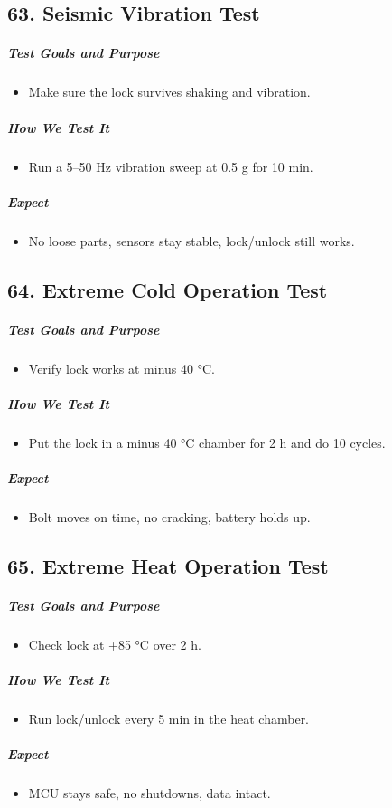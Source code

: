 \subsection*{63. Seismic Vibration Test}
\subparagraph{Test Goals and Purpose}
\begin{itemize}
    \item Make sure the lock survives shaking and vibration.
\end{itemize}
\subparagraph{How We Test It}
\begin{itemize}
    \item Run a 5–50 Hz vibration sweep at 0.5 g for 10 min.
\end{itemize}
\subparagraph{ Expect}
\begin{itemize}
    \item No loose parts, sensors stay stable, lock/unlock still works.
\end{itemize}

\subsection*{64. Extreme Cold Operation Test}
\subparagraph{Test Goals and Purpose}
\begin{itemize}
    \item Verify lock works at minus 40 °C.
\end{itemize}
\subparagraph{How We Test It}
\begin{itemize}
    \item Put the lock in a minus 40 °C chamber for 2 h and do 10 cycles.
\end{itemize}
\subparagraph{ Expect}
\begin{itemize}
    \item Bolt moves on time, no cracking, battery holds up.
\end{itemize}

\subsection*{65. Extreme Heat Operation Test}
\subparagraph{Test Goals and Purpose}
\begin{itemize}
    \item Check lock at +85 °C over 2 h.
\end{itemize}
\subparagraph{How We Test It}
\begin{itemize}
    \item Run lock/unlock every 5 min in the heat chamber.
\end{itemize}
\subparagraph{ Expect}
\begin{itemize}
    \item MCU stays safe, no shutdowns, data intact.
\end{itemize}
